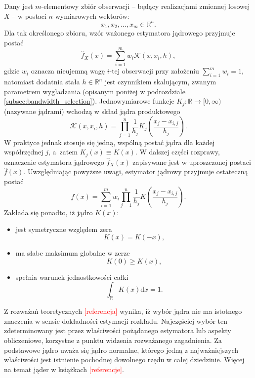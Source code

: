 Dany jest $m$-elementowy zbiór obserwacji -- będący realizacjami zmiennej losowej $X$ -- w postaci $n$-wymiarowych wektorów:
\begin{equation} \label{eq:kde_dataset}
x_1, x_2, ..., x_m \in \mathbb{R}^n.
\end{equation}
Dla tak określonego zbioru, wzór ważonego estymatora jądrowego przyjmuje postać
\begin{equation} \label{eq:kde1}
\hat{f}_X(x) = \sum_{i=1}^m w_i \mathcal{K} (x,x_i,h),
\end{equation}
gdzie $w_i$ oznacza nieujemną wagę $i$-tej obserwacji przy założeniu $\sum_{i=1}^m w_i=1$, natomiast dodatnia stała $h \in \mathbb{R}^n$ jest czynnikiem skalującym, zwanym parametrem wygładzania (opisanym poniżej w podrozdziale \ref{subsec:bandwidth_selection}). Jednowymiarowe funkcje $K_j:\mathbb{R} \rightarrow [0,\infty)$  (nazywane jądrami) wchodzą w skład jądra produktowego
\begin{equation}\label{eq:product_kernel}
\mathcal{K}(x,x_i,h) = \prod_{j=1}^n \frac{1}{h_j} K_j \left( \frac{x_j-x_{i,j}}{h_j} \right).
\end{equation}
W praktyce jednak stosuje się jedną, wspólną postać jądra dla każdej współrzędnej $j$, a~zatem $K_j(x) \equiv K(x)$. W dalszej części rozprawy, oznaczenie estymatora jądrowego $\hat{f}_X(x)$ zapisywane jest w uproszczonej postaci $\hat{f}(x)$. Uwzględniając powyższe uwagi, estymator jądrowy przyjmuje ostateczną postać
\begin{equation} \label{eq:kde2}
\hat{f}(x) = \sum_{i=1}^m w_i \prod_{j=1}^n \frac{1}{h_j} K \left( \frac{x_j-x_{i,j}}{h_j} \right).
\end{equation}
Zakłada się ponadto, iż jądro $K(x)$:
\begin{itemize}
\item jest symetryczne względem zera
\begin{equation} \label{eq:kernel_cond1}
K(x) = K(-x),
\end{equation}
\item ma słabe maksimum globalne w zerze
\begin{equation} \label{eq:kernel_cond2}
K(0) \geq K(x),
\end{equation}
\item spełnia warunek jednostkowości całki
\begin{equation} \label{eq:kernel_cond3}
\int_\mathbb{R} K(x) \mathrm{d}x = 1.
\end{equation}
\end{itemize}
Z rozważań teoretycznych \textcolor{red}{[referencja]} wynika, iż wybór jądra nie ma istotnego znaczenia w sensie dokładności estymacji rozkładu. Najczęściej wybór ten zdeterminowany jest przez właściwości pożądanego estymatora lub aspekty obliczeniowe, korzystne z punktu widzenia rozważanego zagadnienia. Za podstawowe jądro uważa się jądro normalne, którego jedną z najważniejszych właściwości jest istnienie pochodnej dowolnego rzędu w całej dziedzinie. Więcej na temat jąder w książkach \textcolor{red}{[referencje]}.
